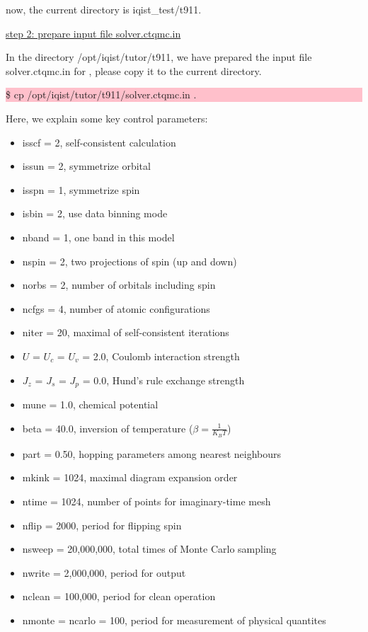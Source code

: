 now, the current directory is iqist\_test/t911.

\underline{step 2: prepare input file solver.ctqmc.in}

In the directory /opt/iqist/tutor/t911, we have prepared the input file solver.ctqmc.in for \azalea, please copy it to the current directory.

\noindent\colorbox{pink}{\parbox[r]{\linewidth}{\quad \$ cp /opt/iqist/tutor/t911/solver.ctqmc.in .}}

Here, we explain some key control parameters:
\begin{itemize}
  \item isscf = 2, self-consistent calculation
  \item issun = 2, symmetrize orbital
  \item isspn = 1, symmetrize spin
  \item isbin = 2, use data binning mode
  \item nband = 1, one band in this model
  \item nspin = 2, two projections of spin (up and down)
  \item norbs = 2, number of orbitals including spin
  \item ncfgs = 4, number of atomic configurations
  \item niter = 20, maximal of self-consistent iterations
  \item $U$ = $U_{c}$ = $U_{v}$ = 2.0, Coulomb interaction strength
  \item $J_{z}$ = $J_{s}$ = $J_{p}$ = 0.0, Hund's rule exchange strength
  \item mune = 1.0, chemical potential
  \item beta = 40.0, inversion of temperature ($\beta=\frac{1}{K_{B}T}$)
  \item part = 0.50, hopping parameters among nearest neighbours
  \item mkink = 1024, maximal diagram expansion order 
  \item ntime = 1024, number of points for imaginary-time mesh
  \item nflip = 2000, period for flipping spin
  \item nsweep = 20,000,000, total times of Monte Carlo sampling
  \item nwrite = 2,000,000, period for output
  \item nclean = 100,000, period for clean operation
  \item nmonte = ncarlo = 100, period for measurement of physical quantites
\end{itemize}

